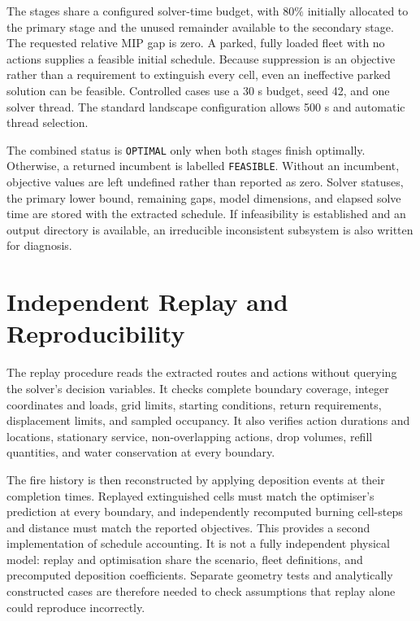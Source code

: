 The stages share a configured solver-time budget, with $80\%$ initially allocated to the primary stage and the unused remainder available to the secondary stage. The requested relative MIP gap is zero. A parked, fully loaded fleet with no actions supplies a feasible initial schedule. Because suppression is an objective rather than a requirement to extinguish every cell, even an ineffective parked solution can be feasible. Controlled cases use a 30 s budget, seed 42, and one solver thread. The standard landscape configuration allows 500 s and automatic thread selection.

The combined status is \texttt{OPTIMAL} only when both stages finish optimally. Otherwise, a returned incumbent is labelled \texttt{FEASIBLE}. Without an incumbent, objective values are left undefined rather than reported as zero. Solver statuses, the primary lower bound, remaining gaps, model dimensions, and elapsed solve time are stored with the extracted schedule. If infeasibility is established and an output directory is available, an irreducible inconsistent subsystem is also written for diagnosis.

\section{Independent Replay and Reproducibility}
\label{sec:method-replay}

The replay procedure reads the extracted routes and actions without querying the solver's decision variables. It checks complete boundary coverage, integer coordinates and loads, grid limits, starting conditions, return requirements, displacement limits, and sampled occupancy. It also verifies action durations and locations, stationary service, non-overlapping actions, drop volumes, refill quantities, and water conservation at every boundary.

The fire history is then reconstructed by applying deposition events at their completion times. Replayed extinguished cells must match the optimiser's prediction at every boundary, and independently recomputed burning cell-steps and distance must match the reported objectives. This provides a second implementation of schedule accounting. It is not a fully independent physical model: replay and optimisation share the scenario, fleet definitions, and precomputed deposition coefficients. Separate geometry tests and analytically constructed cases are therefore needed to check assumptions that replay alone could reproduce incorrectly.

